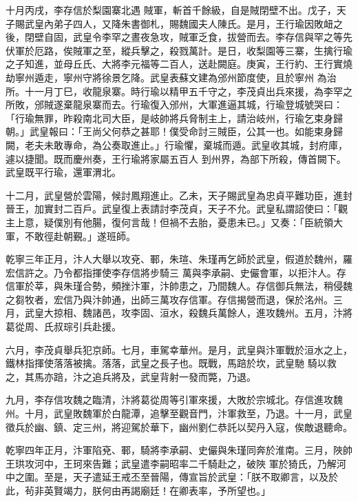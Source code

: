 \begin{pinyinscope}
 十月丙戌，李存信於梨園寨北遇
 賊軍，斬首千餘級，自是賊閉壁不出。戊子，天子賜武皇內弟子四人，又降朱書御札，賜魏國夫人陳氏。是月，王行瑜因敗衄之後，閉壁自固，武皇令李罕之晝夜急攻，賊軍乏食，拔營而去。李存信與罕之等先伏軍於厄路，俟賊軍之至，縱兵擊之，殺戮萬計。是日，收梨園等三寨，生擒行瑜之子知進，並母丘氏、大將李元福等二百人，送赴闕庭。庚寅，王行約、王行實燒劫寧州遁走，寧州守將徐景乞降。武皇表蘇文建為邠州節度使，且於寧州
 為治所。十一月丁巳，收龍泉寨。時行瑜以精甲五千守之，李茂貞出兵來援，為李罕之所敗，邠賊遂棄龍泉寨而去。行瑜復入邠州，大軍進逼其城，行瑜登城號哭曰：「行瑜無罪，昨殺南北司大臣，是岐帥將兵脅制主上，請治岐州，行瑜乞束身歸朝。」武皇報曰：「王尚父何恭之甚耶！僕受命討三賊臣，公其一也。如能束身歸闕，老夫未敢專命，為公奏取進止。」行瑜懼，棄城而遁。武皇收其城，封府庫，遽以捷聞。既而慶州奏，王行瑜將家屬五百人
 到州界，為部下所殺，傳首闕下。武皇既平行瑜，還軍渭北。



 十二月，武皇營於雲陽，候討鳳翔進止。乙未，天子賜武皇為忠貞平難功臣，進封晉王，加實封二百戶。武皇復上表請討李茂貞，天子不允。武皇私謂詔使曰：「觀主上意，疑僕別有他腸，復何言哉！但禍不去胎，憂患未已。」又奏：「臣統領大軍，不敢徑赴朝覲。」遂班師。



 乾寧三年正月，汴人大舉以攻兗、鄆，朱瑄、朱瑾再乞師於武皇，假道於魏州，羅宏信許之。乃令都指揮使李存信將步騎三
 萬與李承嗣、史儼會軍，以拒汴人。存信軍於莘，與朱瑾合勢，頻挫汴軍，汴帥患之，乃間魏人。存信御兵無法，稍侵魏之芻牧者，宏信乃與汴帥通，出師三萬攻存信軍。存信揭營而退，保於洺州。三月，武皇大掠相、魏諸邑，攻李固、洹水，殺魏兵萬餘人，進攻魏州。五月，汴將葛從周、氏叔琮引兵赴援。



 六月，李茂貞舉兵犯京師。七月，車駕幸華州。是月，武皇與汴軍戰於洹水之上，鐵林指揮使落落被擒。落落，武皇之長子也。既戰，馬踣於坎，武皇馳
 騎以救之，其馬亦踣，汴之追兵將及，武皇背射一發而斃，乃退。



 九月，李存信攻魏之臨清，汴將葛從周等引軍來援，大敗於宗城北。存信進攻魏州。十月，武皇敗魏軍於白龍潭，追擊至觀音門，汴軍救至，乃退。十一月，武皇徵兵於幽、鎮、定三州，將迎駕於華下，幽州劉仁恭託以契丹入寇，俟敵退聽命。



 乾寧四年正月，汴軍陷兗、鄆，騎將李承嗣、史儼與朱瑾同奔於淮南。三月，陜帥王珙攻河中，王珂來告難；武皇遣李嗣昭率二千騎赴之，破陜
 軍於猗氏，乃解河中之圍。至是，天子遣延王戒丕至晉陽，傳宣旨於武皇：「朕不取卿言，以及於此，茍非英賢竭力，朕何由再謁廟廷！在卿表率，予所望也。」




\end{pinyinscope}
